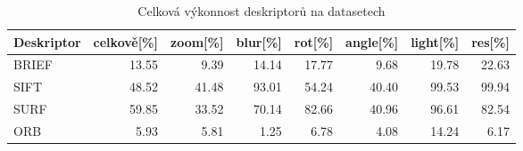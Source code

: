 \begin{table}[!ht]\centering
\begin{tabular}{ l| r r r r r r r }
	Deskriptor & celkově[\%] & zoom[\%] & blur[\%] & rot[\%] & angle[\%] & light[\%] & res[\%] \\
	\hline
	 BRIEF & 13.55 & 9.39 & 14.14 & 17.77 & 9.68 & 19.78 & 22.63 \\
	 SIFT & 48.52 & 41.48 & 93.01 & 54.24 & 40.40 & 99.53 & 99.94 \\
	 SURF & 59.85 & 33.52 & 70.14 & 82.66 & 40.96 & 96.61 & 82.54 \\
	 ORB & 5.93 & 5.81 & 1.25 & 6.78 & 4.08 & 14.24 & 6.17
\end{tabular}
	\caption[Short Heading]{\protect Celková výkonnost deskriptorů na datasetech}\label{tab_descperf}
\end{table}
